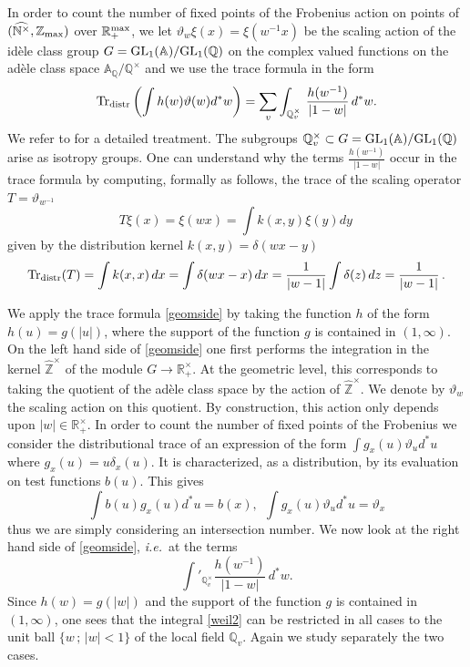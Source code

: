 \documentclass[noams,lp]{compositio}
\def\GL{{\rm GL}}
\def\Tr{{\rm Tr}}
\def\A{{\mathbb A}}
\def\N{{\mathbb N}}
\def\Q{{\mathbb Q}}
\def\R{{\mathbb R}}
\def\Z{{\mathbb Z}}
\def\urep{\vartheta}
\def\Tr{{\rm Tr}}
\newcommand{\ie}{{\it i.e.\/}\ }
\def\zmax{{\Z_{\rm max}}}
\def\rmax{\R_+^{\rm max}}
\def\arith{{(\wnt,\bar \N)}}
\def\wnt{{\widehat{\N^{\times}}}}
\def\arith{{(\wnt,\zmax)}}
\def\hatz{{\hat\Z^\times}}
\begin{document}
In order to count the number of fixed points of the Frobenius action on points of $\arith$ over $\rmax$, we let $
\urep_w\xi(x)=\xi(w^{-1}x)
$ be the scaling action of the id\`ele class group $G=\GL_1(\A)/\GL_1(\Q)$  on the complex valued functions on the ad\`ele class space $\A_\Q/\Q^\times$ and we use the trace formula 
 in the form
\begin{equation}\label{geomside}
\Tr_{\rm distr}\left(\int h(w)\urep(w)d^*w\right )=\sum_v\int_{\Q^\times_v}\,\frac{h(w^{-1})}{|1-w|}\,d^*w.
\end{equation}
We refer to \cite{Co-zeta, Meyer, CMbook} for a detailed treatment.
The subgroups $\Q^\times_v\subset G=\GL_1(\A)/\GL_1(\Q)$ arise as isotropy groups.
One can understand why the terms $\displaystyle \frac{h(w^{-1})}{|1-w|}$ occur in the trace formula by computing, formally as follows, the trace  of the scaling operator $T=\urep_{w^{-1}}$
$$T\xi(x)=\xi(w x)=\int k(x,y)\xi(y)dy\,
 $$
 given by the distribution kernel $k(x,y)=\delta(w x-y)$
 $$
\Tr_{\rm distr}(T)=\int k(x,x)\,dx=\int \delta(w x-x)\,dx=\frac{1}{|w-1|}\int \delta(z)\,dz=\frac{1}{|w-1|}\,.
$$

 We apply the trace formula  \eqref{geomside}  by taking 
 the function $h$ of the form $h(u)=g(|u|)$, where the support of the function $g$ is contained in
$(1,\infty)$. On the left hand side of \eqref{geomside} one first performs the integration in the kernel $\hatz$ of the module $G\to \R_+^\times$. At the geometric level, this corresponds to taking the quotient of the ad\`ele class space by the action of $\hatz$. We denote by $\urep_w$ the scaling action on this quotient. By construction, this action only depends upon $|w|\in \R_+^\times$.
In order to count the number of fixed points of the Frobenius
 we consider the distributional trace of an expression
of the form
$
\int  g_x(u) \urep_u d^*u
$
where $g_x(u)=u\delta_x(u)$. It  is characterized, as a distribution, by its evaluation on test functions $b(u)$. This gives
\begin{equation}\label{deltafun}
    \int b(u)g_x(u)d^*u=b(x), \   \      \int  g_x(u) \urep_u d^*u=\urep_x
\end{equation}
 thus we are simply considering
an intersection number.
We now look at the right hand side of \eqref{geomside}, \ie at the terms
\begin{equation}\label{weil2}
\int'_{\Q_v^\times} \frac{h(w^{-1}) }{   \vert 1-w   \vert} \, d^* w.
\end{equation}
Since $h(w)=g(|w|)$ and  the support of the function $g$ is contained in
$(1,\infty)$, one sees that the integral \eqref{weil2} can be restricted  in all cases to the unit
ball $\{w\,; \,|w|<1\}$ of the local field $\Q_v$. Again we study separately the two cases.
\end{document}
